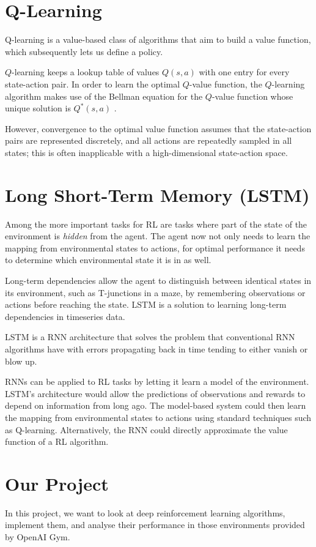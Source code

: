 \documentclass{article}
\begin{document}
\section{Q-Learning}
Q-learning is a value-based class of algorithms that aim to build a value function, which subsequently lets us define a policy.

$Q$-learning keeps a lookup table of values $Q(s,a)$ with one entry for every state-action pair. In order to learn the optimal $Q$-value function, the $Q$-learning algorithm makes use of the Bellman equation for the $Q$-value function whose unique solution is $Q^*(s,a)$ \cite{DBLP:journals/corr/abs-1811-12560}.

However, convergence to the optimal value function assumes that the state-action pairs are represented discretely, and all actions are repeatedly sampled in all states; this is often inapplicable with a high-dimensional state-action space.

\section{Long Short-Term Memory (LSTM) \cite{RLLSTM}}

Among the more important tasks for RL are tasks where part of the state of the environment is \textit{hidden} from the agent. The agent now not only needs to learn the mapping from environmental states to actions, for optimal performance it needs to determine which environmental state it is in as well.

Long-term dependencies allow the agent to distinguish between identical states in its environment, such as T-junctions in a maze, by remembering observations or actions before reaching the state. LSTM is a solution to learning long-term dependencies in timeseries data.

LSTM is a RNN architecture that solves the problem that conventional RNN algorithms have with errors propagating back in time tending to either vanish or blow up.

RNNs can be applied to RL tasks by letting it learn a model of the environment. LSTM's architecture would allow the predictions of observations and rewards to depend on information from long ago. The model-based system could then learn the mapping from environmental states to actions using standard techniques such as Q-learning. Alternatively, the RNN could directly approximate the value function of a RL algorithm.

\section{Our Project}

In this project, we want to look at deep reinforcement learning algorithms, implement them, and analyse their performance in those environments provided by OpenAI Gym.

\printbibliography
\end{document}
